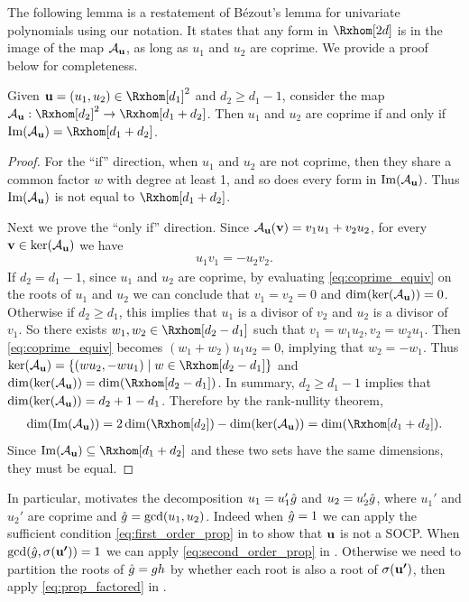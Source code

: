 \documentclass[final,onefignum,onetabnum]{siamart220329}
\begin{document}
The following lemma is a restatement of B\'ezout's lemma for univariate
polynomials using our notation. It states that any form in $\Rxhom[2d]$ is in
the image of the map $\mathcal{A}_{\boldsymbol{\mathbf{u}}}$, as long as $u_1$ and $u_2$ are coprime. We provide
a proof below for completeness.
\begin{lemma}
  \label{lem:coprime_kernel}
  Given $\vecp{u} = (u_1, u_2) \in \Rxhom[d_1]^2$ and $d_2 \ge d_1 - 1$,
  consider the map $\Aup : \Rxhom[d_2]^2 \to \Rxhom[d_1+d_2]$. Then $u_1$ and
  $u_2$ are coprime if and only if $\imag(\Aup) = \Rxhom[d_1+d_2]$.
  \begin{proof}
    For the ``if'' direction, when $u_1$ and $u_2$ are not coprime, then they
    share a common factor $w$ with degree at least 1, and so does every form in
    $\operatorname{Im}(\mathcal{A}_{\boldsymbol{\mathbf{u}}})$. Thus $\operatorname{Im}(\mathcal{A}_{\boldsymbol{\mathbf{u}}})$ is not equal to $\Rxhom[d_1+d_2]$.

    Next we prove the ``only if'' direction. Since
    $\mathcal{A}_{\boldsymbol{\mathbf{u}}}(\boldsymbol{\mathbf{v}}) = v_1 u_1 + v_2 u_2$, for every $\boldsymbol{\mathbf{v}} \in \ker(\mathcal{A}_{\boldsymbol{\mathbf{u}}})$ we
    have
    \begin{align} \label{eq:coprime_equiv}
      u_1v_1 = -u_2v_2.
    \end{align}
    If $d_2 = d_1 - 1$, since $u_1$ and $u_2$ are coprime, by evaluating
    \eqref{eq:coprime_equiv} on the roots of $u_1$ and $u_2$ we can conclude
    that $v_1 = v_2 = 0$ and $\dim(\ker(\mathcal{A}_{\boldsymbol{\mathbf{u}}})) = 0$. Otherwise if $d_2 \ge d_1$,
    this implies that $u_1$ is a divisor of $v_2$ and $u_2$ is a divisor of
    $v_1$. So there exists $w_1, w_2 \in \Rxhom[d_2-d_1]$ such that
    $v_1 = w_1u_2, v_2 = w_2u_1$. Then \eqref{eq:coprime_equiv} becomes
    $(w_1 + w_2)u_1u_2 = 0$, implying that $w_2 = -w_1$.  Thus
    $\ker(\Aup) = \braces{(w u_2, -w u_1) \mid w \in \Rxhom[d_2-d_1]}$ and
    $\dim(\ker(\Aup)) = \dim(\Rxhom[d_2-d_1])$. In summary, $d_2 \ge d_1-1$
    implies that $\dim(\ker(\mathcal{A}_{\boldsymbol{\mathbf{u}}})) = d_2 + 1 - d_1$. Therefore by the
    rank-nullity theorem,
    \begin{align*}
      \dim(\imag(\Aup))
      = 2\dim(\Rxhom[d_2]) - \dim(\ker(\Aup))
      = \dim(\Rxhom[d_1 + d_2]).
    \end{align*}
    Since $\imag(\Aup) \subseteq \Rxhom[d_1+d_2]$ and these two sets have the
    same dimensions, they must be equal.
  \end{proof}
\end{lemma}

In particular,  motivates the decomposition
$u_1 = u_1' \hat{g}$ and $u_2 = u_2' \hat{g}$, where $u_1'$ and $u_2'$ are coprime and
$\hat{g} = \gcd(u_1, u_2)$. Indeed when $\hat{g} = 1$ we can apply the sufficient
condition \eqref{eq:first_order_prop} in  to show that
$\boldsymbol{\mathbf{u}}$ is not a SOCP. When $\gcd(\hat{g}, \sigma(\boldsymbol{\mathbf{u'}})) = 1$ we can apply
\eqref{eq:second_order_prop} in . Otherwise we need to partition
the roots of $\hat{g} = gh$ by whether each root is also a root of
$\sigma(\boldsymbol{\mathbf{u'}})$, then apply \eqref{eq:prop_factored} in
.
\end{document}
